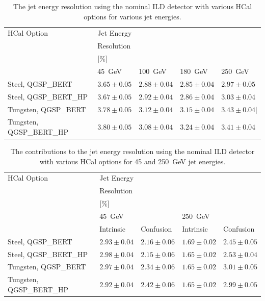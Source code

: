 \begin{table}[h!]
\centering
\begin{tabular}{ l l l l l }
\hline
HCal Option & Jet Energy & & & \\
 & Resolution & & & \\
 & [\%] & & & \\
 & 45~GeV & 100~GeV & 180~GeV & 250~GeV \\
\hline
Steel, QGSP\_BERT & $3.65 \pm 0.05$ &$2.88 \pm 0.04$ &$2.85 \pm 0.04$ &$2.97 \pm 0.05$ \\
Steel, QGSP\_BERT\_HP & $3.67 \pm 0.05$ &$2.92 \pm 0.04$ &$2.86 \pm 0.04$ &$3.03 \pm 0.04$ \\
Tungsten, QGSP\_BERT & $3.78 \pm 0.05$ & $3.12 \pm 0.04$ & $3.15 \pm 0.04$ & $3.43 \pm 0.04 |$ \\
Tungsten, QGSP\_BERT\_HP & $3.80 \pm 0.05$ & $3.08 \pm 0.04$ & $3.24 \pm 0.04$ & $3.41 \pm 0.04$ \\
\hline
\end{tabular}
\caption[The jet energy resolution using the nominal ILD detector with various HCal options for various jet energies.]{The jet energy resolution using the nominal ILD detector with various HCal options for various jet energies.}
\label{table:jerhcalabsmaterial}
\end{table}

\begin{table}[h!]
\centering
\begin{tabular}{ l l l l l }
\hline
HCal Option & Jet Energy & & & \\
 & Resolution & & & \\
 & [\%] & & & \\
 & 45~GeV & & 250~GeV & \\
 & Intrinsic & Confusion & Intrinsic & Confusion \\
\hline
Steel, QGSP\_BERT & $2.93 \pm 0.04$ & $2.16 \pm 0.06$ & $1.69 \pm 0.02$ &$2.45 \pm 0.05$ \\
Steel, QGSP\_BERT\_HP & $2.98 \pm 0.04$ &$2.15 \pm 0.06$ &$1.65 \pm 0.02$ &$2.53 \pm 0.04$ \\
Tungsten, QGSP\_BERT & $2.97 \pm 0.04$ & $2.34 \pm 0.06$ & $1.65 \pm 0.02$ & $3.01 \pm 0.05$ \\
Tungsten, QGSP\_BERT\_HP & $2.92 \pm 0.04$ & $2.42 \pm 0.06$ & $1.65 \pm 0.02$ & $2.99 \pm 0.05$ \\
\hline
\end{tabular}
\caption[The contributions to the jet energy resolution using the nominal ILD detector with various HCal options for 45 and 250~GeV jet energies.]{The contributions to the jet energy resolution using the nominal ILD detector with various HCal options for 45 and 250~GeV jet energies.}
\label{table:jerbdhcalabsmaterial}
\end{table}

